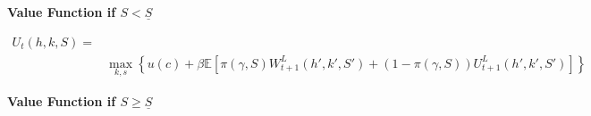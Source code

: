 \documentclass[12pt]{article}
\begin{document}
\textbf{Value Function if $S < \underline{S}$}

\begin{align*}
    U_t(h,k,S) = \\
    &\max_{k,s} \left\{ u(c) + \beta\mathbb{E}\left[\pi(\gamma, S)W^L_{t+1}(h',k',S')
    + (1 - \pi(\gamma, S))U^L_{t+1}(h',k',S')  \right] \right\}
\end{align*}

\textbf{Value Function if $S \geq \underline{S}$}







\end{document}
